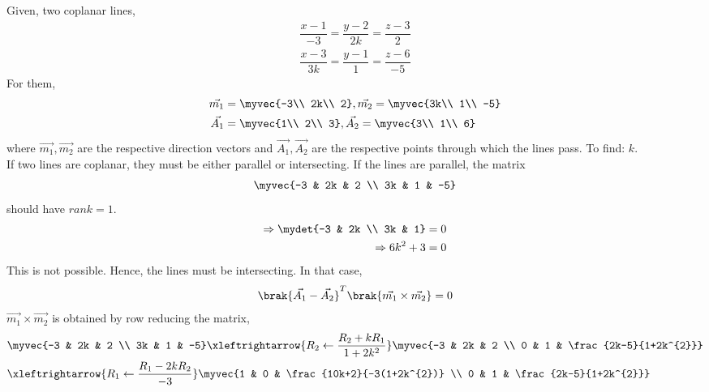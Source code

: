 Given, two coplanar lines,
\begin{align}
\dfrac{x-1}{-3}=\dfrac{y-2}{2k}=\dfrac{z-3}{2}\\
\dfrac{x-3}{3k}=\dfrac{y-1}{1}=\dfrac{z-6}{-5}
\end{align}
For them,
\begin{align}
    \vec{m_{1}}&=\myvec{-3\\
    2k\\
    2}, \vec{m_{2}}=\myvec{3k\\
    1\\
    -5}\\
    \vec{A_{1}}&=\myvec{1\\
    2\\
    3}, \vec{A_{2}}=\myvec{3\\
    1\\
    6}
\end{align}
where $\vec{m_{1}},\vec{m_{2}}$ are the respective direction vectors and $\vec{A_{1}},\vec{A_{2}}$ are the respective points through which the lines pass. To find: $k$.\\
If two lines are coplanar, they must be either parallel or intersecting. If the lines are parallel, the matrix
\begin{align}
    \myvec{-3 & 2k & 2 \\
    3k & 1 & -5}
\end{align}
should have $rank=1$.
\begin{align}
    \Rightarrow \mydet{-3 & 2k \\
    3k & 1} &=0\\
    \Rightarrow 6k^{2}+3&=0
\end{align}
This is not possible. Hence, the lines must be intersecting. In that case,
\begin{align}
    \brak{\vec{A_{1}}-\vec{A_{2}}}^{T}\brak{\vec{m_{1}}\times\vec{m_{2}}}=0\label{sep/2/33/eq:a}
\end{align}
$\vec{m_{1}}\times\vec{m_{2}}$ is obtained by row reducing the matrix,
\begin{align}
    &\myvec{-3 & 2k & 2 \\
    3k & 1 & -5}\xleftrightarrow {R_2\leftarrow\frac{R_2+kR_1}{1+2k^2}}\myvec{-3 & 2k & 2 \\
    0 & 1 & \frac{2k-5}{1+2k^{2}}}\\
    &\xleftrightarrow {R_1\leftarrow \frac{R_1-2kR_2}{-3}}\myvec{1 & 0 & \frac{10k+2}{-3(1+2k^{2})} \\
    0 & 1 & \frac{2k-5}{1+2k^{2}}}
\end{align}

